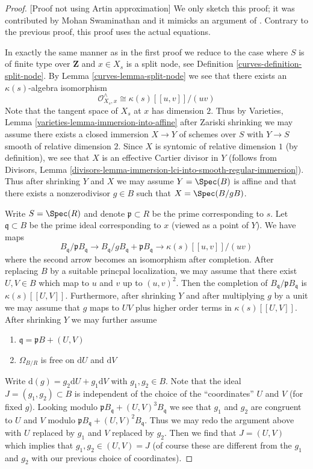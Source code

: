 \begin{proof}
[Proof not using Artin approximation]
We only sketch this proof; it was contributed by Mohan Swaminathan
and it mimicks an argument of \cite[Proposition X.2.1]{ACG}. Contrary
to the previous proof, this proof uses the actual equations.

\medskip\noindent
In exactly the same manner as in the first proof we reduce to the
case where $S$ is of finite type over $\mathbf{Z}$ and $x \in X_s$
is a split node, see Definition \ref{curves-definition-split-node}.
By Lemma \ref{curves-lemma-split-node} we see that there exists an
$\kappa(s)$-algebra isomorphism
$$
\mathcal{O}_{X_s, x}^\wedge \cong \kappa(s)[[u, v]]/(uv)
$$
Note that the tangent space of $X_s$ at $x$ has dimension $2$.
Thus by Varieties, Lemma \ref{varieties-lemma-immersion-into-affine}
after Zariski shrinking we may assume there exists a closed immersion
$X \to Y$ of schemes over $S$ with $Y \to S$ smooth of relative dimension $2$.
Since $X$ is syntomic of relative dimension $1$ (by definition), we see
that $X$ is an effective Cartier divisor in $Y$ (follows from
Divisors, Lemma
\ref{divisors-lemma-immersion-lci-into-smooth-regular-immersion}).
Thus after shrinking $Y$ and $X$ we may assume $Y = \Spec(B)$
is affine and that there exists a nonzerodivisor $g \in B$ such
that $X = \Spec(B/gB)$.

\medskip\noindent
Write $S = \Spec(R)$ and denote $\mathfrak p \subset R$ be the prime
corresponding to $s$. Let $\mathfrak q \subset B$ be the prime ideal
corresponding to $x$ (viewed as a point of $Y$). We have maps
$$
B_\mathfrak q / \mathfrak p B_\mathfrak q
\longrightarrow
B_\mathfrak q / g B_\mathfrak q + \mathfrak p B_\mathfrak q
\longrightarrow
\kappa(s)[[u, v]]/(uv)
$$
where the second arrow becomes an isomorphism after completion.
After replacing $B$ by a suitable princpal localization,
we may assume that there exist $U, V \in B$ which map to
$u$ and $v$ up to $(u, v)^2$. Then the completion of
$B_\mathfrak q/\mathfrak p B_\mathfrak q$
is $\kappa(s)[[U, V]]$. Furthermore, after
shrinking $Y$ and after multiplying $g$ by a unit we may
assume that $g$ maps to $UV$ plus higher order terms in
$\kappa(s)[[U, V]]$. After shrinking $Y$ we may further assume
\begin{enumerate}
\item $\mathfrak q = \mathfrak pB + (U, V)$
\item $\Omega_{B/R}$ is free on $\text{d}U$ and $\text{d}V$
\end{enumerate}
Write $\text{d}(g) = g_2 \text{d}U + g_1 \text{d}V$ with $g_1, g_2 \in B$.
Note that the ideal $J = (g_1, g_2) \subset B$ is independent of the
choice of the ``coordinates'' $U$ and $V$ (for fixed $g$).
Looking modulo $\mathfrak p B_\mathfrak q + (U, V)^3B_\mathfrak q$
we see that $g_1$ and $g_2$ are congruent to $U$ and $V$ modulo
$\mathfrak p B_\mathfrak q + (U, V)^2B_\mathfrak q$.
Thus we may redo the argument above with $U$ replaced by $g_1$
and $V$ replaced by $g_2$. Then we find that $J = (U, V)$
which implies that $g_1, g_2 \in (U, V) = J$ (of course these
are different from the $g_1$ and $g_2$ with our previous choice
of coordinates).


\end{proof}
